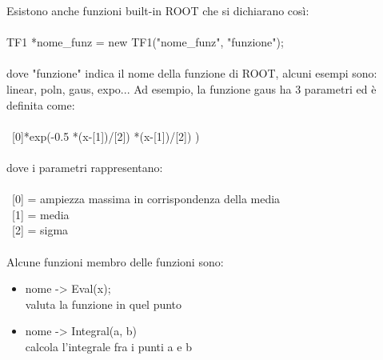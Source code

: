 \documentclass[10pt,a4paper]{article}
\begin{document}
Esistono anche funzioni built-in ROOT che si dichiarano così:\\\\
TF1 *nome\_funz = new TF1("nome\_funz", "funzione");\\\\
dove "funzione" indica il nome della funzione di ROOT, alcuni esempi sono: linear, poln, gaus, expo... Ad esempio, la funzione gaus ha 3 parametri ed è definita come:\\\\
\ [0]*exp(-0.5 *(x-[1])/[2]) *(x-[1])/[2]) )\\\\
dove i parametri rappresentano:\\\\
\ [0] = ampiezza massima in corrispondenza della media\\
\ [1] = media\\
\ [2] = sigma\\\\
Alcune funzioni membro delle funzioni sono:
\begin{itemize}
	\item nome -> Eval(x);\\
	valuta la funzione in quel punto
	\item nome -> Integral(a, b)\\
	calcola l'integrale fra i punti a e b
\end{itemize}
\end{document}
